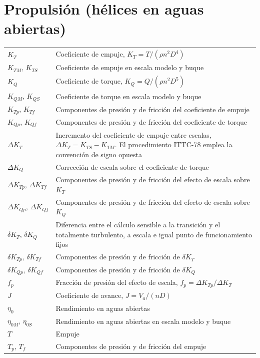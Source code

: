 \section*{Propulsión (hélices en aguas abiertas)}
\begin{longtable}{@{}p{} p{}@{}}
$K_T$       & Coeficiente de empuje, $K_T = T/(\rho n^2 D^4)$ \\
$K_{TM},\,K_{TS}$ & Coeficiente de empuje en escala modelo y buque \\
$K_Q$       & Coeficiente de torque, $K_Q = Q/(\rho n^2 D^5)$ \\
$K_{QM},\,K_{QS}$ & Coeficiente de torque en escala modelo y buque \\
$K_{Tp},\,K_{Tf}$ & Componentes de presión y de fricción del coeficiente de empuje \\
$K_{Qp},\,K_{Qf}$ & Componentes de presión y de fricción del coeficiente de torque \\
$\Delta K_T$      & Incremento del coeficiente de empuje entre escalas, $\Delta K_T = K_{TS}-K_{TM}$. El procedimiento ITTC-78 emplea la convención de signo opuesta \\
$\Delta K_Q$      & Corrección de escala sobre el coeficiente de torque \\
$\Delta K_{Tp},\,\Delta K_{Tf}$ & Componentes de presión y de fricción del efecto de escala sobre $K_T$ \\
$\Delta K_{Qp},\,\Delta K_{Qf}$ & Componentes de presión y de fricción del efecto de escala sobre $K_Q$ \\
$\delta K_T,\,\delta K_Q$ & Diferencia entre el cálculo sensible a la transición y el totalmente turbulento, a escala e igual punto de funcionamiento fijos \\
$\delta K_{Tp},\,\delta K_{Tf}$ & Componentes de presión y de fricción de $\delta K_T$ \\
$\delta K_{Qp},\,\delta K_{Qf}$ & Componentes de presión y de fricción de $\delta K_Q$ \\
$f_p$       & Fracción de presión del efecto de escala, $f_p = \Delta K_{Tp}/\Delta K_T$ \\
$J$         & Coeficiente de avance, $J = V_a/(nD)$ \\
$\eta_0$    & Rendimiento en aguas abiertas \\
$\eta_{0M},\,\eta_{0S}$ & Rendimiento en aguas abiertas en escala modelo y buque \\
$T$         & Empuje \\
$T_p,\,T_f$ & Componentes de presión y de fricción del empuje \\

\end{longtable}
